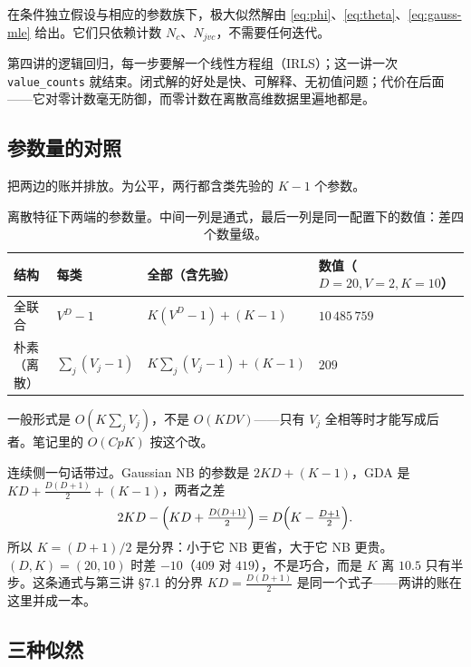 \documentclass[11pt,a4paper,fontset=windows,zihao=-4]{ctexart}
\newcommand{\tabhead}{\sffamily\bfseries\color{navy}}
\begin{document}
\begin{prop}[三组闭式解]
在条件独立假设与相应的参数族下，极大似然解由 \eqref{eq:phi}、\eqref{eq:theta}、\eqref{eq:gauss-mle} 给出。它们只依赖计数 $N_c$、$N_{jvc}$，不需要任何迭代。
\end{prop}

\begin{keybox}
第四讲的逻辑回归，每一步要解一个线性方程组（IRLS）；这一讲一次 \texttt{value\_counts} 就结束。闭式解的好处是快、可解释、无初值问题；代价在后面——它对零计数毫无防御，而零计数在离散高维数据里遍地都是。
\end{keybox}

\subsection{参数量的对照}

把两边的账并排放。为公平，两行都含类先验的 $K-1$ 个参数。

\begin{table}[htbp]
\centering
\small
\begin{tabular}{@{}llll@{}}
\toprule
\rowcolor{navy!7}
\tabhead 结构 & \tabhead 每类 & \tabhead 全部（含先验） & \tabhead 数值（$D=20,V=2,K=10$）\\
\midrule
全联合 & $V^D-1$ & $K(V^D-1)+(K-1)$ & $10\,485\,759$\\
朴素（离散） & $\sum_j(V_j-1)$ & $K\sum_j(V_j-1)+(K-1)$ & $209$\\
\bottomrule
\end{tabular}
\caption{离散特征下两端的参数量。中间一列是通式，最后一列是同一配置下的数值：差四个数量级。}
\label{tab:param}
\end{table}

一般形式是 $O\!\left(K\sum_jV_j\right)$，不是 $O(KDV)$——只有 $V_j$ 全相等时才能写成后者。笔记里的 $O(CpK)$ 按这个改。

连续侧一句话带过。Gaussian NB 的参数是 $2KD+(K-1)$，GDA 是 $KD+\frac{D(D+1)}2+(K-1)$，两者之差
\begin{equation}
  2KD-\Bigl(KD+\tfrac{D(D+1)}2\Bigr)=D\Bigl(K-\tfrac{D+1}2\Bigr).
  \label{eq:paramdiff}
\end{equation}
所以 $K=(D+1)/2$ 是分界：小于它 NB 更省，大于它 NB 更贵。$(D,K)=(20,10)$ 时差 $-10$（$409$ 对 $419$），不是巧合，而是 $K$ 离 $10.5$ 只有半步。这条通式与第三讲 §7.1 的分界 $KD=\frac{D(D+1)}2$ 是同一个式子——两讲的账在这里并成一本。

\subsection{三种似然}
\end{document}
